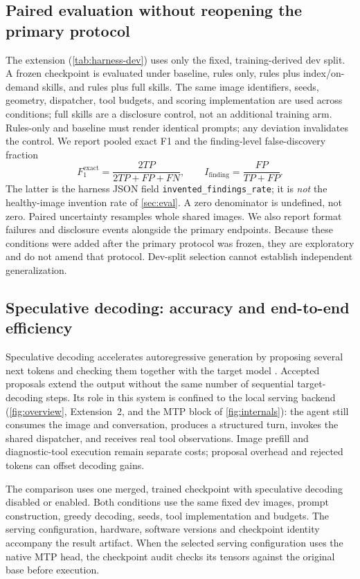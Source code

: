 \subsection{Paired evaluation without reopening the primary protocol}
The extension (\cref{tab:harness-dev}) uses only the fixed, training-derived dev split. A frozen checkpoint is evaluated
under baseline, rules only, rules plus index/on-demand skills, and rules plus full skills.
The same image identifiers, seeds, geometry, dispatcher, tool budgets, and scoring implementation
are used across conditions; full skills are a disclosure control, not an additional training arm.
Rules-only and baseline must render identical prompts; any deviation invalidates the control.
We report pooled exact F1 and the finding-level false-discovery fraction
\[
 F_1^{\mathrm{exact}}=\frac{2TP}{2TP+FP+FN},\qquad
 I_{\mathrm{finding}}=\frac{FP}{TP+FP}.
\]
The latter is the harness JSON field \texttt{invented\_findings\_rate}; it is \emph{not} the
healthy-image invention rate of \cref{sec:eval}. A zero denominator is undefined, not zero.
Paired uncertainty resamples whole shared images. We also report format failures and disclosure events alongside the primary endpoints.
Because these conditions were added after the primary protocol was frozen, they are exploratory
and do not amend that protocol. Dev-split selection cannot establish independent generalization.



\subsection{Speculative decoding: accuracy and end-to-end efficiency}
\label{sec:specdecode}
Speculative decoding accelerates autoregressive generation by proposing several next tokens
and checking them together with the target model \citep{leviathan2023fast,chen2023accelerating}.
Accepted proposals extend the output without the same number of sequential target-decoding
steps. Its role in this system is confined to the local serving backend
(\cref{fig:overview}, Extension~2, and the MTP block of \cref{fig:internals}): the agent still consumes the image and conversation,
produces a structured turn, invokes the shared dispatcher, and receives real tool observations.
Image prefill and diagnostic-tool execution remain separate costs; proposal overhead and
rejected tokens can offset decoding gains.

The comparison uses one merged, trained checkpoint with speculative decoding disabled or
enabled. Both conditions use the same fixed dev images, prompt construction, greedy decoding,
seeds, tool implementation and budgets. The serving configuration, hardware, software versions
and checkpoint identity accompany the result artifact. When the selected serving configuration
uses the native MTP head, the checkpoint audit checks its tensors against the original base
before execution.


